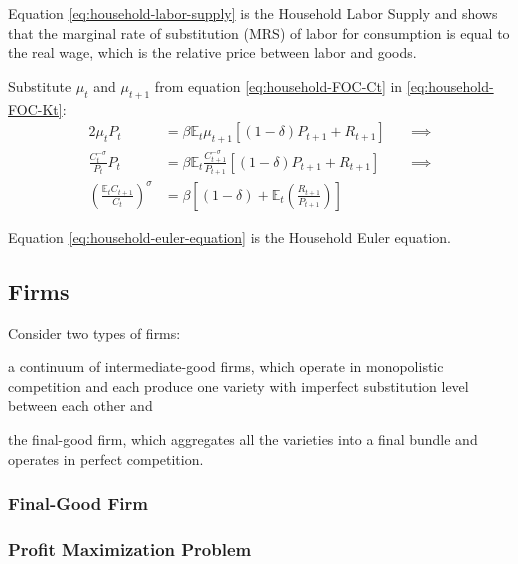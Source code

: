 \documentclass[
thesis.tex
]{subfiles}
\begin{document}
	Equation \ref{eq:household-labor-supply} is the Household Labor Supply and shows that the marginal rate of substitution (MRS) of labor for consumption is equal to the real wage, which is the relative price between labor and goods.
	
	Substitute $\mu_t$ and $\mu_{t+1}$ from equation \ref{eq:household-FOC-Ct} in \ref{eq:household-FOC-Kt}:
	\begin{alignat}{2}
		\mu_t P_t & = \beta \mathbb{E}_t \mu_{t+1} [(1-\delta) P_{t+1} + R_{t+1}] \quad &\implies \nonumber \\
		\frac{C_t^{-\sigma}}{P_t} P_t & = \beta \mathbb{E}_t \frac{C_{t+1}^{-\sigma}}{P_{t+1}} [(1-\delta) P_{t+1} + R_{t+1}] &\implies \nonumber \\
		\left( \frac{\mathbb{E}_t C_{t+1}}{C_t} \right)^\sigma & = \beta \left[ (1-\delta) + \mathbb{E}_t \left(\frac{R_{t+1}}{P_{t+1}}\right) \right] \label{eq:household-euler-equation}
	\end{alignat}
	
	Equation \ref{eq:household-euler-equation} is the Household Euler equation.
	
	
	\subsection*{Firms}
	
	Consider two types of firms: 
	\begin{enumerate*}[label=(\arabic*)]
		\item a continuum of intermediate-good firms, which operate in monopolistic competition and each produce one variety with imperfect substitution level between each other and
		
		\item the final-good firm, which aggregates all the varieties into a final bundle and operates in perfect competition.
	\end{enumerate*}
	
	
	\subsubsection{Final-Good Firm}
	
	\subsubsection*{Profit Maximization Problem}
	
\end{document}
